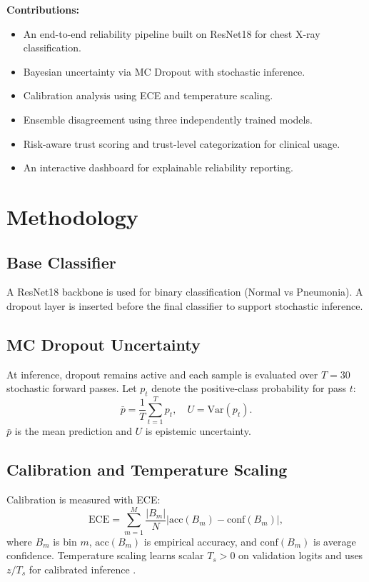 \documentclass[conference]{IEEEtran}
\begin{document}
\textbf{Contributions:}
\begin{itemize}
    \item An end-to-end reliability pipeline built on ResNet18 for chest X-ray classification.
    \item Bayesian uncertainty via MC Dropout with stochastic inference.
    \item Calibration analysis using ECE and temperature scaling.
    \item Ensemble disagreement using three independently trained models.
    \item Risk-aware trust scoring and trust-level categorization for clinical usage.
    \item An interactive dashboard for explainable reliability reporting.
\end{itemize}

\section{Methodology}

\subsection{Base Classifier}
A ResNet18 backbone is used for binary classification (Normal vs Pneumonia). A dropout layer is inserted before the final classifier to support stochastic inference.

\subsection{MC Dropout Uncertainty}
At inference, dropout remains active and each sample is evaluated over $T=30$ stochastic forward passes. Let $p_t$ denote the positive-class probability for pass $t$:
\begin{equation}
\bar{p} = \frac{1}{T}\sum_{t=1}^{T} p_t, \quad
U = \mathrm{Var}(p_t).
\end{equation}
$\bar{p}$ is the mean prediction and $U$ is epistemic uncertainty.

\subsection{Calibration and Temperature Scaling}
Calibration is measured with ECE:
\begin{equation}
\mathrm{ECE} = \sum_{m=1}^{M} \frac{|B_m|}{N} \left|\mathrm{acc}(B_m)-\mathrm{conf}(B_m)\right|,
\end{equation}
where $B_m$ is bin $m$, $\mathrm{acc}(B_m)$ is empirical accuracy, and $\mathrm{conf}(B_m)$ is average confidence. Temperature scaling learns scalar $T_s>0$ on validation logits and uses $z/T_s$ for calibrated inference \cite{guo2017calibration}.
\end{document}
